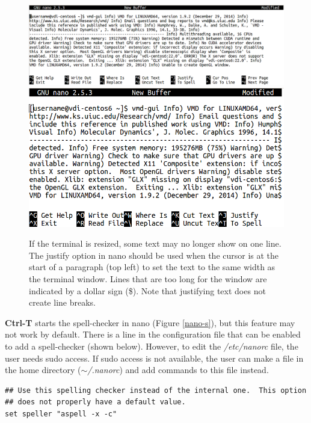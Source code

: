 \documentclass[12pt]{article}
\begin{document}
\begin{figure}[H]
\centering
\caption{If the terminal is resized, some text may no longer show on one line. The justify option in nano should be used when the cursor is at the start of a paragraph (top left) to set the text to the same width as the terminal window. Lines that are too long for the window are indicated by a dollar sign (\$). Note that justifying text does not create line breaks.}
\includegraphics[width=\textwidth]{nano-justify-on}\\
\includegraphics[scale=0.5]{nano-justify-off}
\label{nano-j}
\end{figure} 
  
\quad \textbf{Ctrl-T} starts the spell-checker in nano (Figure \ref{nano-s}), but this feature may not work by default. There is a line in the configuration file that can be enabled to add a spell-checker (shown below). However, to edit the \textit{/etc/nanorc} file, the user needs sudo access. If sudo access is not available, the user can make a file in the home directory (\textit{$\sim$/.nanorc}) and add commands to this file instead.

\begin{lstlisting}[numbers=none]
## Use this spelling checker instead of the internal one.  This option
## does not properly have a default value.
set speller "aspell -x -c"
\end{lstlisting}
\end{document}
